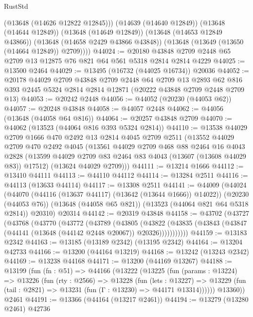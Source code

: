 \begin{lexlean}{RustStd}
\begin{coremodule}
          (@13648 (@14626 @12822 @12845)))
        (@14639 (@14640 @12849))
        (@13648 (@14644 @12849))
        (@13648 (@14649 @12849))
        (@13648 (@14653 @12849 @43866))
        (@13648 (@14658 @2429 @43866 @43848))
        (@13648 (@13649 (@13650 (@14664 @12849)) @2709))))
@44024 := @20180 @43848 @2709 @2448 @65 @2709 @13 @12875 @76 @821 @64 @561 @5318 @2814 @2814 @4229
@44025 := @13500 @2464
@44029 := @13495 (@16732 (@44025 @16734)) @20036
@44052 := @20178
    @44029
    @2709
    @43848
    @2709
    @2448
    @64
    @2709
    @13
    @2893
    @62
    @816
    @393
    @2445
    @5324
    @2814
    @2814
    @12871
    (@20222 @43848 @2709 @2448 @2709 @13)
@44053 := @20242 @2448
@44056 := @44052 (@20230 (@44053 @62))
@44057 := @20248 @43848
@44058 := @44057 @2448
@44062 := @44056 (@13648 (@44058 @64 @816))
@44064 := @20257 @43848 @2709
@44070 := @44062 (@13523 (@44064 @816 @393 @5324 @2814))
@44110 := @13538
    @44029
    @2709
    @1666
    @470
    @2492
    @13
    @2814
    @4045
    @2709
    @2511
    (@13552
      @44029
      @2709
      @470
      @2492
      @4045
      (@13561
        @44029
        @2709
        @468
        @88
        @2464
        @16
        @4043
        @2828
        (@13599 @44029 @2709 @83 @2464 @83 @4043 (@13607 (@13608 @44029 @83)) @17512)
        (@13624 @44029 @2709)))
@44111 := @13214 @1666
@44112 := @13410 @44111
@44113 := @44110 @44112
@44114 := @13284 @2511
@44116 := @44113 (@13633 @44114)
@44117 := @13308 @2511
@44141 := @44009
    (@44024
      (@44070 (@44116 (@13637 @44117) (@13642 (@13644 @1666)) @14022))
      (@20230 (@44053 @76))
      (@13648 (@44058 @65 @821))
      (@13523 (@44064 @821 @64 @5318 @2814))
      @20310)
    @20314
@44142 := @20319 @43848
@44158 := @43702
    (@43727
      (@43768
        (@43770
          (@43772
            (@43789
              (@43805
                (@43822
                  (@43835 (@43843 (@43847 (@44141 (@13648 (@44142 @2448 @20067)) @20326)))))))))))
@44159 := @13183 @2342
@44163 := @13185 (@13189 @2342) (@13195 @2342)
@44164 := @13204 @42733
@44166 := @13200 (@44164 @13219)
@44168 := @13242 (@13243 @2342)
@44169 := @13238 @44168
@44171 := @13200 (@44169 @13267)
@44188 := @13199
    (fun (fn : @51) =>
    @44166
      (@13222
        (@13225
          (fun (params : @13224) =>
          @13226
            (fun (rty : @2566) =>
            @13228
              (fun (lets : @13227) =>
              @13229 (fun (tail : @2821) => @13231 (fun (Γ : @13230) => @44171 @13314))))))
        @13360))
    @2461
@44191 := @13366 (@44164 (@13217 @2461))
@44194 := @13279 (@13280 @2461) @42736

\end{coremodule}
\end{lexlean}
